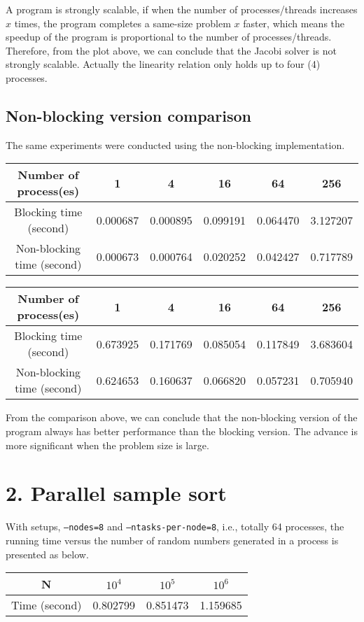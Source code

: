 \documentclass[amsmath,amssymb]{revtex4}
\begin{document}
A program is strongly scalable, if when the number of processes/threads increases $x$ times, the program completes a same-size problem $x$ faster, which means the speedup of the program is proportional to the number of processes/threads. Therefore, from the plot above, we can conclude that the Jacobi solver is not strongly scalable. Actually the linearity relation only holds up to four (4) processes.

\subsection{\label{sec:sec1.3}Non-blocking version comparison}
The same experiments were conducted using the non-blocking implementation.
\begin{center}
  \begin{tabular}{c | c | c | c | c | c}
    \hline
Number of process(es) & 1  & 4 & 16 & 64 &256     \\ \hline
Blocking time (second)    & 0.000687 & 0.000895 & 0.099191 & 0.064470 & 3.127207 \\ \hline
Non-blocking time (second) & 0.000673 & 0.000764&  0.020252& 0.042427 & 0.717789\\ \hline
  \end{tabular}
\end{center}

\begin{center}
  \begin{tabular}{c | c | c | c | c | c}
    \hline
Number of process(es) & 1  & 4 & 16 & 64 &256     \\ \hline
Blocking time        (second)  & 0.673925 & 0.171769 & 0.085054 & 0.117849 & 3.683604 \\ \hline
Non-blocking time (second) & 0.624653 & 0.160637& 0.066820 &  0.057231& 0.705940 \\ \hline
  \end{tabular}
\end{center}

From the comparison above, we can conclude that the non-blocking version of the program always has better performance than the blocking version. The advance is more significant when the problem size is large.

\section{\label{sec:sec2}2. Parallel sample sort}
With setups, {\tt --nodes=8} and {\tt --ntasks-per-node=8}, i.e., totally 64 processes, the running time versus the number of random numbers generated in a process is presented as below.

\begin{center}
  \begin{tabular}{c | c | c | c }
    \hline
N & $10^4$  & $10^5$ & $10^6$    \\ \hline
Time (second) & 0.802799 & 0.851473&  1.159685\\ \hline
  \end{tabular}
\end{center}
\end{document}
